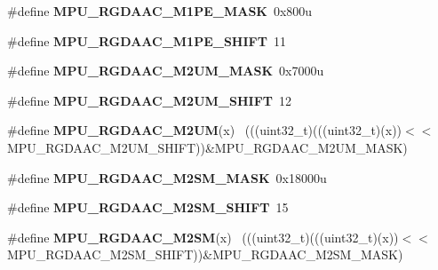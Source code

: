 \begin{DoxyCompactItemize}
\item 
\hypertarget{group___m_p_u___register___masks_ga9943b4e0d9ec5824c79a4e8b3bad623c}{}\#define {\bfseries M\+P\+U\+\_\+\+R\+G\+D\+A\+A\+C\+\_\+\+M1\+P\+E\+\_\+\+M\+A\+S\+K}~0x800u\label{group___m_p_u___register___masks_ga9943b4e0d9ec5824c79a4e8b3bad623c}

\item 
\hypertarget{group___m_p_u___register___masks_ga4e5a6355ee05c02aa02393db9a418318}{}\#define {\bfseries M\+P\+U\+\_\+\+R\+G\+D\+A\+A\+C\+\_\+\+M1\+P\+E\+\_\+\+S\+H\+I\+F\+T}~11\label{group___m_p_u___register___masks_ga4e5a6355ee05c02aa02393db9a418318}

\item 
\hypertarget{group___m_p_u___register___masks_ga8d7b4cc87aa01ac1fc57eee990df39c7}{}\#define {\bfseries M\+P\+U\+\_\+\+R\+G\+D\+A\+A\+C\+\_\+\+M2\+U\+M\+\_\+\+M\+A\+S\+K}~0x7000u\label{group___m_p_u___register___masks_ga8d7b4cc87aa01ac1fc57eee990df39c7}

\item 
\hypertarget{group___m_p_u___register___masks_ga1d5c046770993c99be4542472930ca76}{}\#define {\bfseries M\+P\+U\+\_\+\+R\+G\+D\+A\+A\+C\+\_\+\+M2\+U\+M\+\_\+\+S\+H\+I\+F\+T}~12\label{group___m_p_u___register___masks_ga1d5c046770993c99be4542472930ca76}

\item 
\hypertarget{group___m_p_u___register___masks_gac64278901508100a0d6ad9072218bb95}{}\#define {\bfseries M\+P\+U\+\_\+\+R\+G\+D\+A\+A\+C\+\_\+\+M2\+U\+M}(x)                                          ~(((uint32\+\_\+t)(((uint32\+\_\+t)(x))$<$$<$M\+P\+U\+\_\+\+R\+G\+D\+A\+A\+C\+\_\+\+M2\+U\+M\+\_\+\+S\+H\+I\+F\+T))\&M\+P\+U\+\_\+\+R\+G\+D\+A\+A\+C\+\_\+\+M2\+U\+M\+\_\+\+M\+A\+S\+K)\label{group___m_p_u___register___masks_gac64278901508100a0d6ad9072218bb95}

\item 
\hypertarget{group___m_p_u___register___masks_ga6add3ff0b896e284766090212deee537}{}\#define {\bfseries M\+P\+U\+\_\+\+R\+G\+D\+A\+A\+C\+\_\+\+M2\+S\+M\+\_\+\+M\+A\+S\+K}~0x18000u\label{group___m_p_u___register___masks_ga6add3ff0b896e284766090212deee537}

\item 
\hypertarget{group___m_p_u___register___masks_ga3ad37821b5be6daf16f1a497562a34e8}{}\#define {\bfseries M\+P\+U\+\_\+\+R\+G\+D\+A\+A\+C\+\_\+\+M2\+S\+M\+\_\+\+S\+H\+I\+F\+T}~15\label{group___m_p_u___register___masks_ga3ad37821b5be6daf16f1a497562a34e8}

\item 
\hypertarget{group___m_p_u___register___masks_ga2ca6bcca3d16364c0c0b26396b34f569}{}\#define {\bfseries M\+P\+U\+\_\+\+R\+G\+D\+A\+A\+C\+\_\+\+M2\+S\+M}(x)                                          ~(((uint32\+\_\+t)(((uint32\+\_\+t)(x))$<$$<$M\+P\+U\+\_\+\+R\+G\+D\+A\+A\+C\+\_\+\+M2\+S\+M\+\_\+\+S\+H\+I\+F\+T))\&M\+P\+U\+\_\+\+R\+G\+D\+A\+A\+C\+\_\+\+M2\+S\+M\+\_\+\+M\+A\+S\+K)\label{group___m_p_u___register___masks_ga2ca6bcca3d16364c0c0b26396b34f569}


\end{DoxyCompactItemize}
